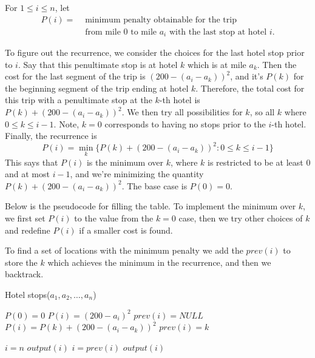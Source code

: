 \documentclass[12pt]{article}
\begin{document}
 For $1\le i \le n$, let
\begin{eqnarray*}
  P(i)  = & \mbox{ minimum penalty obtainable for the trip} \\
&   \mbox{ from mile 0
 to mile $a_i$ with the last stop at hotel $i$.}
 \end{eqnarray*}

 To figure out the recurrence, we consider the choices for the last
 hotel stop prior to $i$.  Say that this penultimate stop is at hotel $k$ which is at mile $a_k$.  
 Then the cost for the last segment of the trip is $(200 - (a_i - a_k))^2$,
 and it's $P(k)$ for the beginning segment of the trip ending at hotel $k$.
 Therefore, the total cost for this trip with a penultimate stop at the $k$-th hotel is
 $P(k) + (200 - (a_i - a_k))^2$.
We then try all possibilities for $k$, so all $k$ where $0\le k\le i-1$.
Note, $k=0$ corresponds to having no stops prior to the $i$-th hotel.
Finally, the recurrence is
\[ P(i) = \min_{k} \{P(k) + (200 - (a_i - a_k))^2 : 0\le k\le i-1\}
\]
This says that $P(i)$ is the minimum over $k$, where $k$ is
restricted to be at least $0$ and at most $i-1$, and we're
minimizing the quantity $P(k) +  (200 - (a_i - a_k))^2$.
The base case is $P(0) = 0$.

Below is the pseudocode for filling the table.  To implement the minimum over $k$,
we first set $P(i)$ to the value from the $k=0$ case,
then we try other choices of $k$ and redefine $P(i)$ if a smaller
cost is found.

To find a set of locations with the minimum penalty we add the $prev(i)$ to
store the $k$ which achieves the minimum in the recurrence, and then we backtrack.

\begin{algorithm}[h!]
\caption{Hotel stops($a_1,a_2,\dots,a_n$)}
\begin{algorithmic}
\STATE $P(0) = 0$
\STATE $P(i) = (200 - a_i)^2$
\STATE $prev(i) = NULL$
\STATE $P(i)=P(k) + (200 - (a_i - a_k))^2$
\STATE $prev(i) = k$
\ENDIF
\ENDFOR
\ENDFOR


\STATE $i=n$
\STATE $output(i)$
\STATE $i = prev(i)$
\STATE  $output(i)$
  \ENDWHILE
\end{algorithmic}
\end{algorithm}
\end{document}
